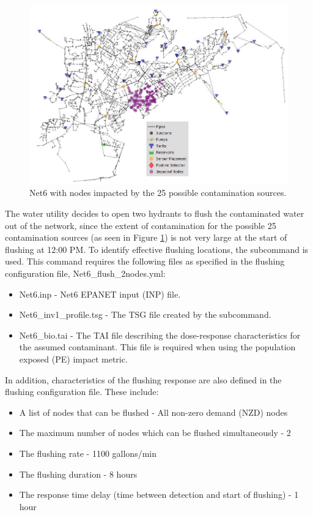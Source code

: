 \begin{figure}[h!]
\begin{center}
\includegraphics[scale=0.6]{graphics/Net6_imapcted_nodes_25inj.JPG}
\caption{Net6 with nodes impacted by the 25 possible contamination sources.}
\label{fig:wds_impacted_nodes}
\end{center}
\end{figure}

The water utility decides to open two hydrants to flush the contaminated water out of the network, 
since the extent of contamination for the possible 25 contamination sources (as seen in 
Figure \ref{fig:wds_impacted_nodes}) is not very large at the 
start of flushing at 12:00 PM. To identify effective 
flushing locations, the  subcommand is used. This command requires the following 
files as specified in the flushing configuration file, Net6\_flush\_2nodes.yml:

\begin{itemize}
\item Net6.inp - Net6 EPANET input (INP) file.
\item Net6\_inv1\_profile.tsg - The TSG file created by the  subcommand.
\item Net6\_bio.tai - The TAI file describing the dose-response characteristics for the assumed contaminant. 
This file is required when using the population exposed (PE) impact metric. 
\end{itemize}  

In addition, characteristics of the flushing response are also defined in the 
flushing configuration file. These include:

\begin{itemize}
\item A list of nodes that can be flushed - All non-zero demand (NZD) nodes 
\item The maximum number of nodes which can be flushed simultaneously - 2 
\item The flushing rate - 1100 gallons/min
\item The flushing duration - 8 hours 
\item The response time delay (time between detection and start of flushing) - 1 hour
\end{itemize}  

